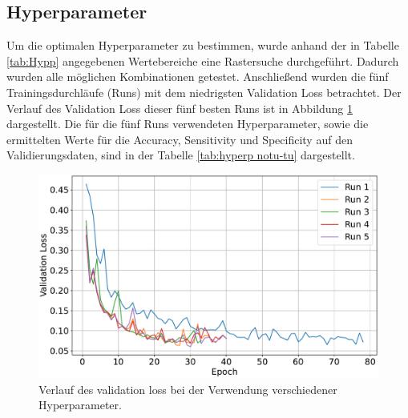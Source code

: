 \subsection{Hyperparameter}
Um die optimalen Hyperparameter zu bestimmen, wurde anhand der in Tabelle \ref{tab:Hypp} angegebenen Wertebereiche eine Rastersuche durchgeführt.
Dadurch wurden alle möglichen Kombinationen getestet.
Anschließend wurden die fünf Trainingsdurchläufe (Runs) mit dem niedrigsten Validation Loss betrachtet.
Der Verlauf des Validation Loss dieser fünf besten Runs ist in Abbildung \ref{fig:val_loss notu-tu} dargestellt.
Die für die fünf Runs verwendeten Hyperparameter, sowie die ermittelten Werte für die Accuracy, Sensitivity und Specificity auf den Validierungsdaten,
sind in der Tabelle \ref{tab:hyperp notu-tu} dargestellt.
\begin{figure}[H]
  \centering
  \includegraphics[scale=0.3]{plots/Val_loss_noTu_Tu.pdf}
  \caption{Verlauf des validation loss bei der Verwendung verschiedener Hyperparameter.}
  \label{fig:val_loss notu-tu}
\end{figure}
\begin{table}[H]
    \centering
  \caption{Die fünf Runs mit dem niedrigsten validation loss sowie deren verwendete Hyperparameter und aufgezeichnete Metriken.}
  \label{tab:hyperp notu-tu}
\end{table}
